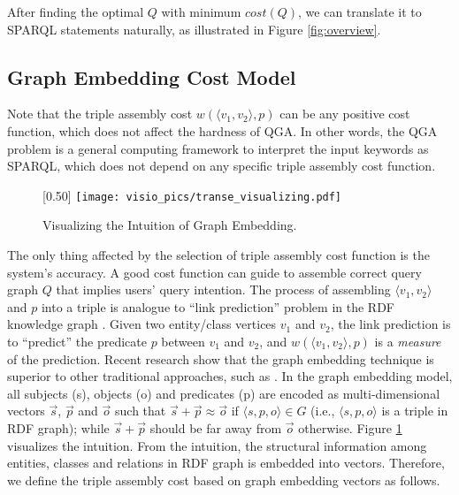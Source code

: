 After finding the optimal $Q$ with minimum $cost(Q)$, we can translate it to SPARQL statements naturally, as illustrated in Figure \ref{fig:overview}.

\subsection{Graph Embedding Cost Model}
Note that the triple assembly cost $w(\langle v_1, v_2\rangle,p)$ can be any positive cost function, which does not affect the hardness of QGA. In other words, the QGA problem is a general computing framework to interpret the input keywords as SPARQL, which does not depend on any specific triple assembly cost function.

\begin{figure} [b]
	\centering
	\scalebox{0.55} [0.50]
	{
		\resizebox{\linewidth}{!}
		{
			\texttt{[image: visio\_pics/transe\_visualizing.pdf]}
		}
	}
	\caption{Visualizing the Intuition of Graph Embedding.}
	\label{fig:transe_visualizing}
	\vspace{-0.2in}
\end{figure}

The only thing affected by the selection of triple assembly cost function is the system's accuracy. A good cost function can guide to assemble correct query graph $Q$ that implies users' query intention. The process of assembling $\langle v_1, v_2\rangle$ and $p$ into a triple is analogue to ``link prediction'' problem in the RDF knowledge graph \cite{miller2009nonparametric}. Given two entity/class vertices $v_1$ and $v_2$, the link prediction is to ``predict'' the predicate $p$ between $v_1$ and $v_2$, and $w(\langle v_1,v_2\rangle, p)$ is a \emph{measure} of the prediction. Recent research show that the graph embedding technique is superior to other traditional approaches, such as \cite{miller2009nonparametric,nickel2011three,jenatton2012latent}. In the graph embedding model, all subjects (s), objects (o) and predicates (p) are encoded as multi-dimensional vectors $\overrightarrow{s}$, $\overrightarrow{p}$ and $\overrightarrow{o}$ such that $\overrightarrow s  + \overrightarrow p  \approx \overrightarrow o $ if $\langle s,p,o \rangle \in G$ (i.e., $\langle s,p,o\rangle$ is a triple in RDF graph); while $\overrightarrow s  + \overrightarrow p$ should be far away from $\overrightarrow o$ otherwise. Figure \ref{fig:transe_visualizing} visualizes the intuition. From the intuition, the structural information among entities, classes and relations in RDF graph is embedded into vectors. Therefore, we define the triple assembly cost based on graph embedding vectors as follows.


